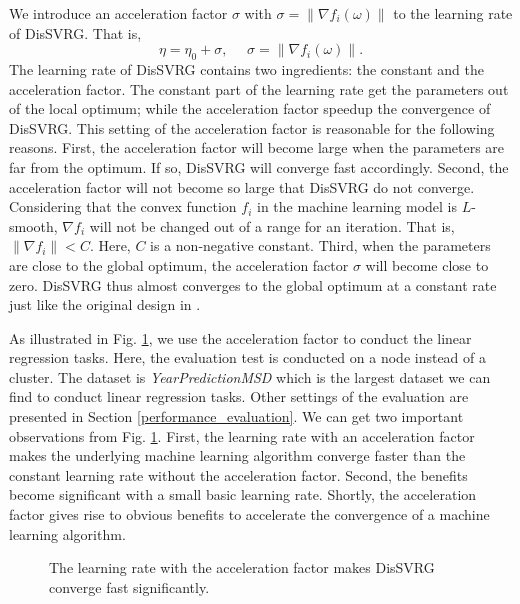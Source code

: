 \documentclass[preprint,review,11pt,a4paper]{elsarticle}
\begin{document}
We introduce an acceleration factor $\sigma$ with $\sigma=\parallel \nabla f_i(\omega)\parallel$ to the learning rate of DisSVRG. That is,
\begin{equation}
\eta=\eta_0+\sigma,~~~~~~\sigma=\parallel \nabla f_i(\omega)\parallel.
\end{equation}
The learning rate of DisSVRG contains two ingredients: the constant and the acceleration factor. The constant part of the learning rate get the parameters out of the local optimum; while the acceleration factor speedup the convergence of DisSVRG. This setting of the acceleration factor is reasonable for the following reasons. First, the acceleration factor will become large when the parameters are far from the optimum. If so, DisSVRG will converge fast accordingly. Second, the acceleration factor will not become so large that DisSVRG do not converge. Considering that the convex function $f_i$ in the machine learning model is $L$-smooth, $\nabla f_i$ will not be changed out of  a range for an iteration. That is, $\parallel\nabla f_i\parallel<C$. Here, $C$ is a non-negative constant. Third, when the parameters are close to the global optimum, the acceleration factor $\sigma$ will become close to zero. DisSVRG thus almost converges to the global optimum at a constant rate just like the original design in \cite{Johnson:9MAvkbgy}.

As illustrated in Fig. \ref{figure_evaluation_accelerated_factor}, we use the acceleration factor to conduct the linear regression tasks. Here, the evaluation test is conducted on a node instead of a cluster. The dataset is \emph{YearPredictionMSD} which is the largest dataset we can find to conduct linear regression tasks. Other settings of the evaluation are presented in Section \ref{performance_evaluation}.  We can get two important observations from Fig. \ref{figure_evaluation_accelerated_factor}. First, the learning rate with an acceleration factor makes the underlying machine learning algorithm converge faster than the constant learning rate without the acceleration factor. Second, the benefits become significant with a small basic learning rate. Shortly, the acceleration factor gives rise to obvious benefits to accelerate the convergence of a machine learning algorithm.

\begin{figure}
\centering
{}
\caption{The learning rate with the acceleration factor makes DisSVRG converge fast significantly.}
\label{figure_evaluation_accelerated_factor}
\end{figure}
\end{document}
